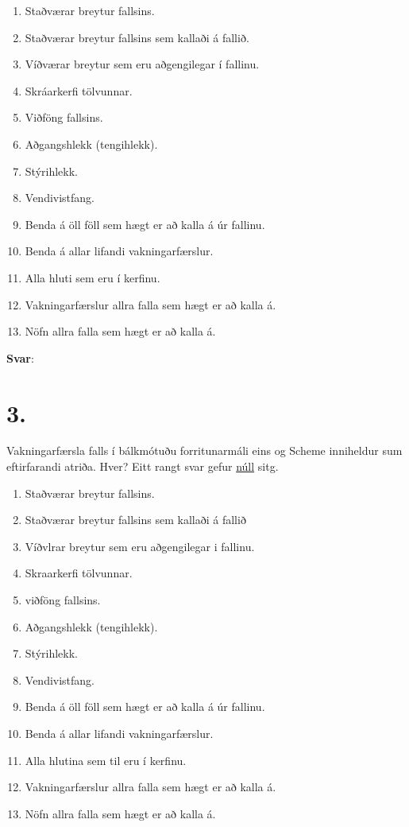 \documentclass{article}
\begin{document}
\begin{enumerate}[label = \alph*)]
    \item Staðværar breytur fallsins.
    \item Staðværar breytur fallsins sem kallaði á fallið.
    \item Víðværar breytur sem eru aðgengilegar í fallinu.
    \item Skráarkerfi tölvunnar.
    \item Viðföng fallsins.
    \item Aðgangshlekk (tengihlekk).
    \item Stýrihlekk.
    \item Vendivistfang.
    \item Benda á öll föll sem hægt er að kalla á úr fallinu.
    \item Benda á allar lifandi vakningarfærslur.
    \item Alla hluti sem eru í kerfinu.
    \item Vakningarfærslur allra falla sem hægt er að kalla á.
    \item Nöfn allra falla sem hægt er að kalla á.
\end{enumerate}

\textbf{Svar}:


 \newpage

 \section{3.}
    Vakningarfærsla falls í bálkmótuðu forritunarmáli eins og Scheme inniheldur sum eftirfarandi atriða. Hver? Eitt rangt svar gefur \underline{núll} sitg.

    \begin{enumerate}[label = \alph*)]
        \item Staðværar breytur fallsins.
        \item Staðværar breytur fallsins sem kallaði á fallið
        \item Víðvlrar breytur sem eru aðgengilegar i fallinu.
        \item Skraarkerfi tölvunnar.
        \item viðföng fallsins.
        \item Aðgangshlekk (tengihlekk).
        \item Stýrihlekk.
        \item Vendivistfang.
        \item Benda á öll föll sem hægt er að kalla á úr fallinu.
        \item Benda á allar lifandi vakningarfærslur. 
        \item Alla hlutina sem til eru í kerfinu.
        \item Vakningarfærslur allra falla sem hægt er að kalla á.
        \item Nöfn allra falla sem hægt er að kalla á.
    \end{enumerate}
\end{document}
